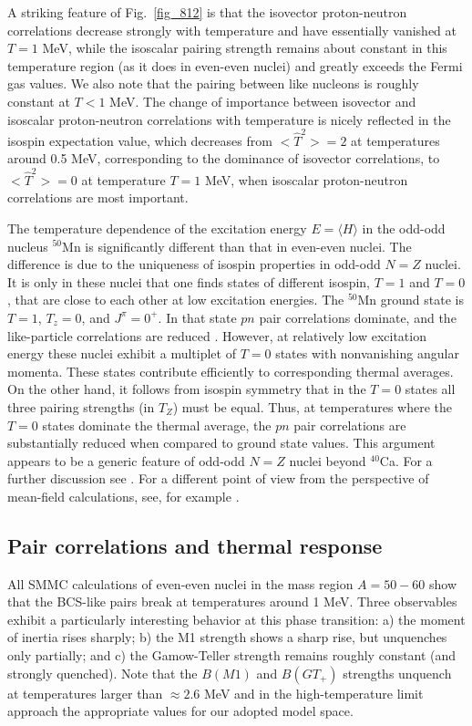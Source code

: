 \documentclass[rmp,aps,floatfix]{revtex4}
\begin{document}
A striking feature of Fig.~\ref{fig_812} is that the isovector
proton-neutron correlations decrease strongly with temperature
and have essentially vanished
at $T=1$ MeV, while the isoscalar pairing strength
remains about constant in this temperature region
(as it does in even-even nuclei) and greatly exceeds the Fermi gas values.
We also note that the pairing between like
nucleons is roughly constant at $T<1$ MeV.
The change of importance between isovector and isoscalar proton-neutron
correlations with temperature is nicely reflected in the isospin expectation
value, which decreases from $<\hat T^2>=2$ at temperatures around 0.5 MeV,
corresponding to the dominance
of isovector correlations, to $<\hat T^2>=0$ at temperature $T=1$ MeV, when
isoscalar proton-neutron correlations are most important.

The temperature dependence of the excitation energy $E=\langle H\rangle$
in the odd-odd nucleus $^{50}$Mn is significantly different than that in 
even-even nuclei. The difference is due to the uniqueness of isospin
properties in odd-odd $N=Z$ nuclei. It is only in these nuclei that one 
finds states of different isospin, $T=1$ and $T=0$, that are close to
each other at low excitation energies. The $^{50}$Mn ground state
is $T=1$, $T_z=0$, and $J^\pi=0^+$. In that state $pn$ pair correlations 
dominate, and the like-particle correlations are reduced \cite{langanke97}.
However, at relatively low excitation energy these nuclei exhibit a 
multiplet of $T=0$ states with nonvanishing angular momenta. These 
states contribute efficiently to corresponding thermal averages. 
On the other hand, it follows from isospin symmetry that in the $T=0$
states all three pairing strengths (in $T_Z$) must be equal. Thus, at
temperatures where the $T=0$ states dominate the thermal average, the $pn$
pair correlations are substantially reduced when compared to ground
state values.  This argument appears to be a generic feature
of odd-odd $N=Z$ nuclei beyond $^{40}$Ca. For a further discussion  
see \cite{zheng97}.  For a different point of view from the 
perspective of mean-field calculations, see, for example \cite{ropke00}.





\noindent
\subsection{Pair correlations and thermal response}

All SMMC calculations of even-even nuclei
in the mass region $A=50-60$ show
that the BCS-like pairs
break at temperatures around 1 MeV.
Three observables exhibit a particularly interesting behavior
at this phase transition: a) the moment of inertia rises sharply; b) the
M1 strength shows a sharp rise, but unquenches only partially; and c)
the Gamow-Teller strength remains roughly constant (and strongly quenched).
Note that
the $B(M1)$ and $B(GT_+)$ strengths unquench at temperatures larger than
$\approx 2.6$ MeV and
in the high-temperature limit
approach the appropriate values for our adopted model space.
\end{document}
